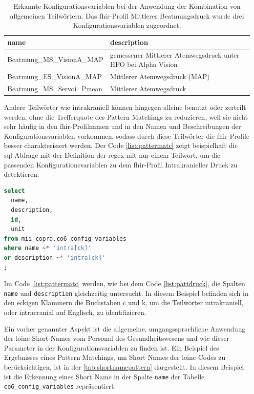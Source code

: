 \begin{longtable}{|l|p{5cm}|}
	\caption[Erkannte Konfigurationsvariablen durch eine \acs{regex} mit einer Kombination von allgemeinen Teilwörtern]{Erkannte Konfigurationsvariablen bei der Anwendung der Kombination von allgemeinen Teilwörtern. Das \ac{fhir}-Profil Mittlerer Beatmungsdruck wurde drei Konfigurationsvariablen zugeordnet.}
	\label{tab:mittatmdruck}
	\endfirsthead
		\hline
		 \bfseries name & \bfseries description \\ \hline
		  Beatmung\_MS\_VisionA\_MAP & gemessener Mittlerer Atemwegsdruck unter HFO bei Alpha Vision \\ \hline
		  Beatmung\_ES\_VisionA\_MAP & Mittlerer Atemwegsdruck (MAP) \\ \hline                             
		  Beatmung\_MS\_Servoi\_Pmean & Mittlerer Atemwegsdruck \\ \hline   
\end{longtable}

Andere Teilwörter wie \glqq intrakraniell\grqq{} können hingegen alleine benutzt oder zerteilt werden, ohne die Trefferquote des Pattern Matchings zu reduzieren, weil sie nicht sehr häufig in den \ac{fhir}-Profilnamen und in den Namen und Beschreibungen der Konfigurationsvariablen vorkommen, sodass durch diese Teilwörter die \ac{fhir}-Profile besser charakterisiert werden. Der Code \ref{list:pattermatc} zeigt beispielhaft die \ac{sql}-Abfrage mit der Definition der \ac{regex} mit nur einem Teilwort, um die passenden Konfigurationsvariablen zu dem \ac{fhir}-Profil \glqq Intrakranieller Druck\grqq{} zu detektieren.

\begin{lstlisting}[language=SQL, caption={[SQL-Abfrage mit einem seltenen Teilwort] SQL-Abfrage mit einem seltenen Teilwort.}, captionpos=b, label=list:pattermatc]
select 
  name, 
  description, 
  id, 
  unit
from mii_copra.co6_config_variables 
where name ~* 'intra[ck]'
or description ~* 'intra[ck]'
;
\end{lstlisting}

Im Code \ref{list:pattermatc} werden, wie bei dem Code \ref{list:pattdruck}, die Spalten \texttt{name} und \texttt{description} gleichzeitig untersucht. In diesem Beispiel befinden sich in den eckigen Klammern die Buchstaben \glqq c\grqq{} und \glqq k\grqq{}, um die Teilwörter \glqq intrakraniell\grqq{}, oder \glqq intracranial\grqq{} auf Englisch, zu identifizieren.

Ein vorher genannter Aspekt ist die allgemeine, umgangssprachliche Anwendung der \ac{loinc}-\glqq Short Names\grqq{} vom Personal des Gesundheitswesens und wie dieser Parameter in der Konfigurationsvariablen zu finden ist. Ein Beispiel des Ergebnisses eines Pattern Matchings, um \glqq Short Names\grqq{} der \ac{loinc}-Codes zu berücksichtigen, ist in der \ref{tab:shortnamepattern} dargestellt. In diesem Beispiel ist die Erkennung eines \glqq Short Name\grqq{} in der Spalte \texttt{name} der Tabelle \texttt{co6\_config\_variables} repräsentiert.

